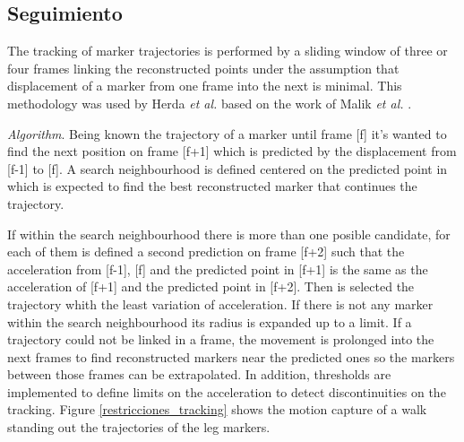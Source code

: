 \subsection{Seguimiento}

The tracking of marker trajectories is performed by a sliding window of three or four frames linking the reconstructed points under the assumption that displacement of a marker from one frame into the next is minimal. This methodology was used by Herda \textit{et al.} \cite{herda} based on the work of Malik \textit{et al.} \cite{griegos}.

\hspace*{0.5cm} \textit{Algorithm}. Being known the trajectory of a marker until frame [f]  it's wanted to find the next position on frame [f+1] which is predicted by the displacement from [f-1] to [f]. A search neighbourhood is defined centered on the predicted point in which is expected to find the best reconstructed marker that continues the trajectory.

If within the search neighbourhood there is more than one posible candidate, for each of them is defined a second prediction on frame [f+2] such that the acceleration from [f-1], [f] and the predicted point in [f+1] is the same as the acceleration of [f+1] and the predicted point in [f+2]. Then is selected the trajectory whith the least variation of acceleration. If there is not any marker within the search neighbourhood  its radius is expanded up to a limit. If a trajectory could not be linked in a frame, the movement is prolonged into the next frames to find reconstructed markers near the predicted ones so the markers between those frames can be extrapolated. In addition, thresholds are implemented to define limits on the acceleration to detect discontinuities on the tracking. Figure \ref{restricciones_tracking} shows the motion capture of a walk standing out the trajectories of the leg markers.

